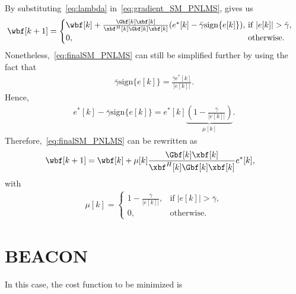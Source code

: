 By substituting~\eqref{eq:lambda} in~\eqref{eq:gradient_SM_PNLMS}, gives us
\begin{align}\label{eq:finalSM_PNLMS}
	\wbf[k+1] &= \begin{cases}
				\wbf[k]+ \frac{\Gbf[k]\xbf[k]}{\xbf^H[k]\Gbf[k]\xbf[k]}(e^*[k] - \bar{\gamma}\mathrm{sign}\{e[k]\}) , \!\!\!\!&\mathrm{if\;} \vert e[k]\vert > \bar{\gamma},\\
				0, & \mathrm{otherwise}.
	             \end{cases}
\end{align}
Nonetheless,~\eqref{eq:finalSM_PNLMS} can still be simplified further by using the fact that
\begin{align}
	\bar{\gamma}\mathrm{sign}\{e[k]\} = \frac{\bar{\gamma}e^*[k]}{\vert e[k] \vert}.
\end{align}
Hence,
\begin{align}
	e^*[k] - \bar{\gamma}\mathrm{sign}\{e[k]\} = e^*[k]\underbrace{\left(1 - \frac{\bar{\gamma}}{\vert e[k]\vert} \right)}_{\mu[k]}.
\end{align}
Therefore,~\eqref{eq:finalSM_PNLMS} can be rewritten as
\begin{align}\label{eq:finalSM_PNLMS_2}
	\wbf[k+1] &= \wbf[k]+ \mu[k]\frac{\Gbf[k]\xbf[k]}{\xbf^H[k]\Gbf[k]\xbf[k]}e^*[k],
\end{align}
with
\begin{align}
	\mu[k] = \begin{cases}
	         	1 - \frac{\bar{\gamma}}{\vert e[k] \vert}, \!\!\!\!&\mathrm{if\;}  
			\vert e[k]\vert > \bar{\gamma},\\
			0, & \mathrm{otherwise}.
	         \end{cases}
\end{align}




\section{BEACON}
\label{ap:BEACON}
In this case, the cost function to be minimized is

